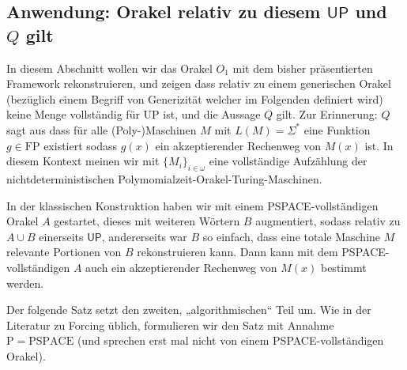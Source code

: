 \documentclass[nofonts]{uebung}
\theoremstyle{definition}
\def\P{\ensuremath{\mathrm{P}}}
\def\FP{\ensuremath{\mathrm{FP}}}
\def\UP{\ensuremath{\mathrm{UP}}}
\def\PSPACE{\ensuremath{\mathrm{PSPACE}}}
\def\hUP{\ensuremath{\mathsf{UP}}}
\begin{document}

\subsection*{Anwendung: Orakel relativ zu diesem $\hUP$ und $Q$ gilt}

In diesem Abschnitt wollen wir das Orakel $O_1$ mit dem bisher präsentierten Framework rekonstruieren, und zeigen dass relativ zu einem generischen Orakel (bezüglich einem Begriff von Generizität welcher im Folgenden definiert wird) keine Menge vollständig für $\UP$ ist, und die Aussage $Q$ gilt. Zur Erinnerung: $Q$ sagt aus dass für alle (Poly-)Maschinen $M$ mit $L(M)=\Sigma^*$ eine Funktion $g\in\FP$ existiert sodass $g(x)$ ein akzeptierender Rechenweg von $M(x)$ ist.
In diesem Kontext meinen wir mit $\{M_i\}_{i\in\omega}$ eine vollständige Aufzählung der nichtdeterministischen Polymomialzeit-Orakel-Turing-Maschinen.

In der klassischen Konstruktion haben wir mit einem PSPACE-vollständigen Orakel $A$ gestartet, dieses mit weiteren Wörtern $B$ augmentiert, sodass relativ zu $A\cup B$ einerseits $\hUP$, andererseits war $B$ so einfach, dass eine totale Maschine $M$ relevante Portionen von $B$ rekonstruieren kann. Dann kann mit dem PSPACE-vollständigen $A$ auch ein akzeptierender Rechenweg von $M(x)$ bestimmt werden.

Der folgende Satz setzt den zweiten, „algorithmischen“ Teil um. Wie in der Literatur zu Forcing üblich, formulieren wir den Satz mit Annahme $\P=\PSPACE$ (und sprechen erst mal nicht von einem PSPACE-vollständigen Orakel).
\end{document}
